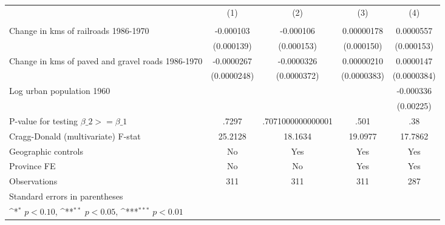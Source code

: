 {
\def\sym#1{\ifmmode^{#1}\else\(^{#1}\)\fi}
\begin{tabular}{l*{4}{c}}
\hline\hline
                &\multicolumn{1}{c}{(1)}&\multicolumn{1}{c}{(2)}&\multicolumn{1}{c}{(3)}&\multicolumn{1}{c}{(4)}\\
                &\multicolumn{1}{c}{}&\multicolumn{1}{c}{}&\multicolumn{1}{c}{}&\multicolumn{1}{c}{}\\
\hline
Change in kms of railroads 1986-1970&-0.000103         &-0.000106         &0.00000178         &0.0000557         \\
                &(0.000139)         &(0.000153)         &(0.000150)         &(0.000153)         \\
[1em]
Change in kms of paved and gravel roads 1986-1970&-0.0000267         &-0.0000326         &0.00000210         &0.0000147         \\
                &(0.0000248)         &(0.0000372)         &(0.0000383)         &(0.0000384)         \\
[1em]
Log urban population 1960&                  &                  &                  &-0.000336         \\
                &                  &                  &                  &(0.00225)         \\
\hline
P-value for testing $\beta\_{2} >= \beta\_{1}$&    .7297         &.7071000000000001         &     .501         &      .38         \\
Cragg-Donald (multivariate) F-stat&  25.2128         &  18.1634         &  19.0977         &  17.7862         \\
Geographic controls&       No         &      Yes         &      Yes         &      Yes         \\
Province FE     &       No         &       No         &      Yes         &      Yes         \\
Observations    &      311         &      311         &      311         &      287         \\
\hline\hline
\multicolumn{5}{l}{\footnotesize Standard errors in parentheses}\\
\multicolumn{5}{l}{\footnotesize \sym{*} \(p<0.10\), \sym{**} \(p<0.05\), \sym{***} \(p<0.01\)}\\
\end{tabular}
}

